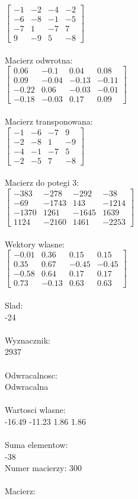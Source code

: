 \documentclass[a4paper,12pt]{article}
\begin{document}
$\begin{bmatrix} -1&-2&-4&-2\\-6&-8&-1&-5\\-7&1&-7&7\\9&-9&5&-8 \end{bmatrix}$
\\
\\
Macierz odwrotna:\\

$\begin{bmatrix} 0.06&-0.1&0.04&0.08\\0.09&-0.04&-0.13&-0.11\\-0.22&0.06&-0.03&-0.01\\-0.18&-0.03&0.17&0.09 \end{bmatrix}$
\\
\\
Macierz transponowana:\\

$\begin{bmatrix} -1&-6&-7&9\\-2&-8&1&-9\\-4&-1&-7&5\\-2&-5&7&-8 \end{bmatrix}$
\\
\\
Macierz do potegi 3:\\

$\begin{bmatrix} -383&-278&-292&-38\\-69&-1743&143&-1214\\-1370&1261&-1645&1639\\1124&-2160&1461&-2253 \end{bmatrix}$
\\
\\
Wektory wlasne:\\

$\begin{bmatrix} -0.01&0.36&0.15&0.15\\0.35&0.67&-0.45&-0.45\\-0.58&0.64&0.17&0.17\\0.73&-0.13&0.63&0.63 \end{bmatrix}$
\\
\\
Slad:\\
-24
\\
\\
Wyznacznik:\\
2937
\\
\\
Odwracalnosc:\\
Odwracalna
\\
\\
Wartosci wlasne:\\
-16.49 -11.23 1.86 1.86
\\
\\
Suma elementow:\\
-38
\\
\newpage
Numer macierzy:
300
\\
\\
Macierz:\\
\end{document}
